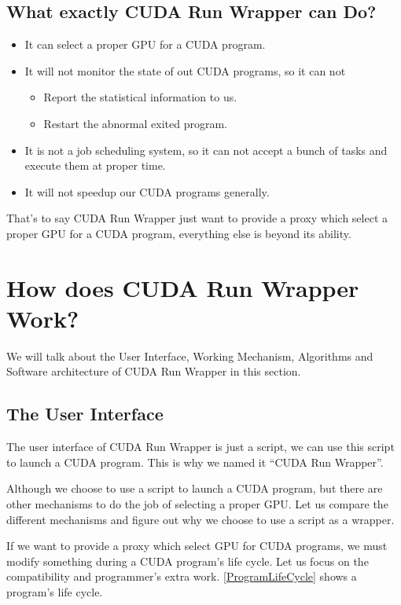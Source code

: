 \documentclass[a4paper,11pt]{article}
\begin{document}
\subsection{What exactly CUDA Run Wrapper can Do?}
\begin{itemize}
  \item It can select a proper GPU for a CUDA program.
  \item It will not monitor the state of out CUDA programs, so it can not
     \begin{itemize}
       \item Report the statistical information to us.
       \item Restart the abnormal exited program.
     \end{itemize}
  \item It is not a job scheduling system, so it can not accept a bunch of tasks and execute them at proper time.
  \item It will not speedup our CUDA programs generally.
\end{itemize}
That's to say CUDA Run Wrapper just want to provide a proxy which select a proper GPU for a CUDA program, everything else is beyond its ability.

\section{How does CUDA Run Wrapper Work?}
We will talk about the User Interface, Working Mechanism, Algorithms and Software architecture of CUDA Run Wrapper in this section.
\subsection{The User Interface}
The user interface of CUDA Run Wrapper is just a script, we can use this script to launch a CUDA program.
This is why we named it ``CUDA Run Wrapper''.

Although we choose to use a script to launch a CUDA program, but there are other mechanisms to do the job of selecting  a proper GPU.
Let us compare the different mechanisms and figure out why we choose to use a script as a wrapper.

If we want to provide a proxy which select GPU for CUDA programs, we must modify something during a CUDA program's life cycle.
Let us focus on the compatibility and programmer's extra work. \autoref{ProgramLifeCycle} shows a program's life cycle.
\end{document}
